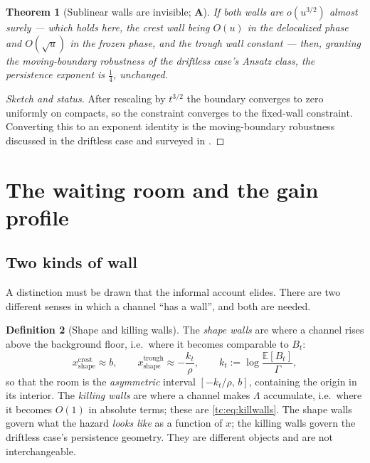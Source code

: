 \documentclass[11pt]{article}
\numberwithin{equation}{section}
\theoremstyle{plain}
\newtheorem{theorem}{Theorem}[section]
\theoremstyle{definition}
\newtheorem{definition}[theorem]{Definition}
\theoremstyle{remark}
\newcommand{\E}{\mathbb{E}}
\begin{document}
\begin{theorem}[Sublinear walls are invisible; \textbf{A}]
\label{tc:thm:sublinear}
If both walls are $o(u^{3/2})$ almost surely --- which holds here, the
crest wall being $O(u)$ in the delocalized phase and $O(\sqrt u)$ in the
frozen phase, and the trough wall constant --- then, granting the
moving-boundary robustness of the driftless case's Ansatz class, the
persistence exponent is $\tfrac14$, unchanged.
\end{theorem}

\begin{proof}[Sketch and status]
After rescaling by $t^{3/2}$ the boundary converges to zero uniformly on
compacts, so the constraint converges to the fixed-wall constraint.
Converting this to an exponent identity is the moving-boundary
robustness discussed in the driftless case and surveyed in \cite{AS15}.
\end{proof}

\section{The waiting room and the gain profile}\label{app:room}

\label{tc:sub:room}

\subsection{Two kinds of wall}\label{tc:subsub:twowalls}

A distinction must be drawn that the informal account elides. There are
two different senses in which a channel ``has a wall'', and both are
needed.

\begin{definition}[Shape and killing walls]\label{tc:def:walls}
The \emph{shape walls} are where a channel rises above the background
floor, i.e.\ where it becomes comparable to $B_t$:
\begin{equation}\label{tc:eq:shapewalls}
x^{\mathrm{crest}}_{\mathrm{shape}}\approx b,
\qquad
x^{\mathrm{trough}}_{\mathrm{shape}}\approx-\frac{k_t}{\rho},
\qquad
k_t:=\log\frac{\E[B_t]}{\Gamma},
\end{equation}
so that the room is the \emph{asymmetric} interval $[-k_t/\rho,\,b]$,
containing the origin in its interior.
The \emph{killing walls} are where a channel makes $\Lambda$ accumulate,
i.e.\ where it becomes $O(1)$ in absolute terms; these are
\eqref{tc:eq:killwalls}. The shape walls govern what the hazard
\emph{looks like} as a function of $x$; the killing walls govern
the driftless case's persistence geometry. They are different objects and are
not interchangeable.
\end{definition}
\end{document}
